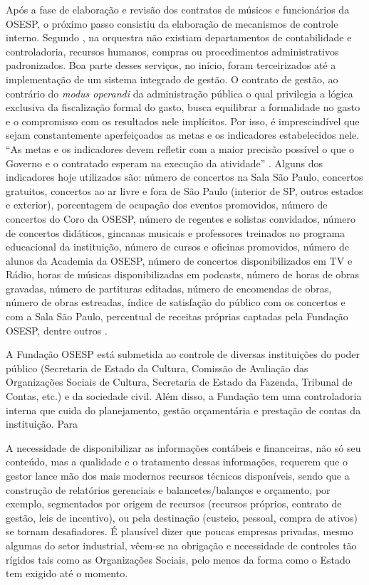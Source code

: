 \documentclass[a4paper, 12pt, openright, oneside, german, french, english, brazil]{abntex2}
\begin{document}
	Após a fase de elaboração e revisão dos contratos de músicos e funcionários da OSESP, o próximo passo consistiu da elaboração de mecanismos de controle interno. Segundo , na orquestra não existiam departamentos de contabilidade e controladoria, recursos humanos, compras ou procedimentos administrativos padronizados. Boa parte desses serviços, no início, foram terceirizados até a implementação de um sistema integrado de gestão. O contrato de gestão, ao contrário do \textit{modus operandi} da administração pública o qual privilegia a lógica exclusiva da fiscalização formal do gasto, busca equilibrar a formalidade no gasto e o compromisso com os resultados nele implícitos. Por isso, é imprescindível que sejam constantemente aperfeiçoados as metas e os indicadores estabelecidos nele. ``As metas e os indicadores devem refletir com a maior precisão possível o que o Governo e o contratado esperam na execução da atividade'' \cite[p. 15]{arruda2010parcerias}. Alguns dos indicadores hoje utilizados são: número de concertos na Sala São Paulo, concertos gratuitos, concertos ao ar livre e fora de São Paulo (interior de SP, outros estados e exterior), porcentagem de ocupação dos eventos promovidos, número de concertos do Coro da OSESP, número de regentes e solistas convidados, número de concertos didáticos, gincanas musicais e professores treinados no programa educacional da instituição, número de cursos e oficinas promovidos, número de alunos da Academia da OSESP, número de concertos disponibilizados em TV e Rádio, horas de músicas disponibilizadas em podcasts, número de horas de obras gravadas, número de partituras editadas, número de encomendas de obras, número de obras estreadas, índice de satisfação do público com os concertos e com a Sala São Paulo, percentual de receitas próprias captadas pela Fundação OSESP, dentre outros \cite{osesp2014anexo1}.
	
	A Fundação OSESP está submetida ao controle de diversas instituições do poder público (Secretaria de Estado da Cultura, Comissão de Avaliação das Organizações Sociais de Cultura, Secretaria de Estado da Fazenda, Tribunal de Contas, etc.) e da sociedade civil. Além disso, a Fundação tem uma controladoria interna que cuida do planejamento, gestão orçamentária e prestação de contas da instituição. Para 
	
	\begin{citacao}
		A  necessidade  de  disponibilizar  as  informações  contábeis  e  financeiras, não  só  seu conteúdo,  mas  a  qualidade  e  o  tratamento dessas  informações, requerem que o gestor lance mão dos mais modernos recursos técnicos disponíveis, sendo que a construção de relatórios gerenciais e balancetes/balanços e orçamento, por  exemplo,  segmentados  por  origem  de recursos  (recursos  próprios,  contrato  de gestão, leis de incentivo), ou pela destinação (custeio, pessoal, compra de ativos) se tornam  desafiadores.  É  plausível  dizer  que  poucas  empresas  privadas,  mesmo algumas  do  setor  industrial,  vêem-se  na  obrigação  e necessidade de  controles  tão rígidos tais como as Organizações Sociais, pelo menos da forma como o Estado tem exigido até o momento. \cite[p. 16]{arruda2010parcerias}
	\end{citacao}
	
\end{document}

